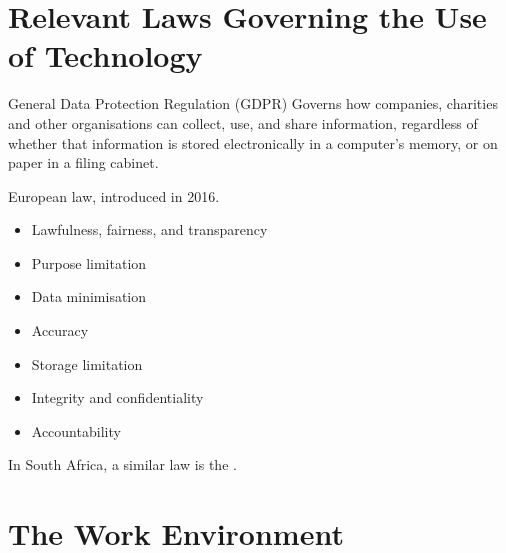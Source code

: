 \documentclass[\main/notes.tex]{subfiles}
\begin{document}
		\section[Relevant Laws]{Relevant Laws Governing the Use of Technology}
			\begin{definition}{General Data Protection Regulation (GDPR)}
				Governs how companies, charities and other organisations can collect, use, and share information, regardless of whether that information is stored electronically in a computer's memory, or on paper in a filing cabinet.

				European law, introduced in 2016.
				\begin{multicols}{2}
					\begin{itemize}[nosep]
						\item Lawfulness, fairness, and transparency
						\item Purpose limitation
						\item Data minimisation
						\item Accuracy
						\item Storage limitation
						\item Integrity and confidentiality
						\item Accountability
					\end{itemize}
				\end{multicols}
			\end{definition}
			In South Africa, a similar law is the .

		\section{The Work Environment}
\end{document}
